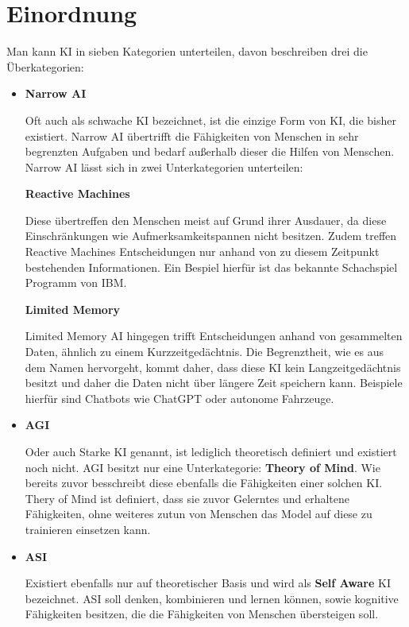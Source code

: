 \section{Einordnung}
Man kann \ac{KI} in sieben Kategorien unterteilen, 
davon beschreiben drei die Überkategorien:
\smallskip
\begin{itemize}
    \item \textbf{Narrow \ac{AI}}
    
    Oft auch als schwache KI bezeichnet, ist die einzige Form von KI, 
    die bisher existiert. Narrow \ac{AI} übertrifft die Fähigkeiten von Menschen
    in sehr begrenzten Aufgaben und bedarf außerhalb dieser die Hilfen von Menschen.
    Narrow \ac{AI} lässt sich in zwei Unterkategorien unterteilen:
    
    \subitem \textbf{Reactive Machines}

    Diese übertreffen den Menschen meist auf Grund ihrer Ausdauer, 
    da diese Einschränkungen wie Aufmerksamkeitspannen nicht besitzen. 
    Zudem treffen Reactive Machines Entscheidungen nur anhand von zu diesem Zeitpunkt bestehenden Informationen.
    Ein Bespiel hierfür ist das bekannte Schachspiel Programm von IBM.
    
    \subitem \textbf{Limited Memory}

    Limited Memory \ac{AI} hingegen trifft Entscheidungen anhand von gesammelten Daten, 
    ähnlich zu einem Kurzzeitgedächtnis. Die Begrenztheit, wie es aus dem Namen hervorgeht, 
    kommt daher, dass diese \ac{KI} kein Langzeitgedächtnis besitzt und daher die Daten nicht über längere Zeit speichern kann. 
    Beispiele hierfür sind Chatbots wie ChatGPT oder autonome Fahrzeuge.
    
    \item \textbf{\ac{AGI}}
    
    Oder auch Starke \ac{KI} genannt, ist lediglich theoretisch definiert und existiert noch nicht. 
    \ac{AGI} besitzt nur eine Unterkategorie: \textbf{Theory of Mind}. 
    Wie bereits zuvor besschreibt diese ebenfalls die Fähigkeiten einer solchen \ac{KI}. 
    Thery of Mind ist definiert, dass sie zuvor Gelerntes und erhaltene Fähigkeiten, 
    ohne weiteres zutun von Menschen das Model auf diese zu trainieren einsetzen kann.
    
    \item \textbf{\ac{ASI}}
    
    Existiert ebenfalls nur auf theoretischer Basis und wird als \textbf{Self Aware} \ac{KI} bezeichnet. 
    \ac{ASI} soll denken, kombinieren und lernen können, sowie kognitive Fähigkeiten besitzen, 
    die die Fähigkeiten von Menschen übersteigen soll.
\end{itemize}

